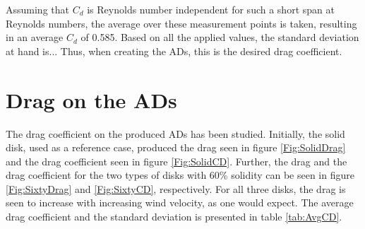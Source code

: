 Assuming that $C_d$ is Reynolds number independent for such a short span at Reynolds numbers, the average over these measurement points is taken, resulting in an average $C_d$ of 0.585. Based on all the applied values, the standard deviation at hand is... Thus, when creating the ADs, this is the desired drag coefficient. 



\section{Drag on the ADs}

The drag coefficient on the produced ADs has been studied. Initially, the solid disk, used as a reference case, produced the drag seen in figure \ref{Fig:SolidDrag} and the drag coefficient seen in figure \ref{Fig:SolidCD}. Further, the drag and the drag coefficient for the two types of disks with 60\% solidity can be seen in figure \ref{Fig:SixtyDrag} and \ref{Fig:SixtyCD}, respectively. For all three disks, the drag is seen to increase with increasing wind velocity, as one would expect. The average drag coefficient and the standard deviation is presented in table \ref{tab:AvgCD}.


